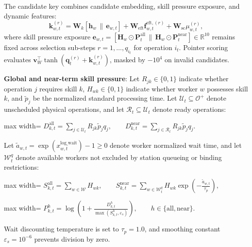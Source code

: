 \documentclass[journal,10pt]{IEEEtran}
\begin{document}
The candidate key combines candidate embedding, skill pressure exposure, and dynamic features:
\begin{equation}
\mathbf k_{w,t}^{(r)}=\mathbf W_k[\mathbf h_w\,\|\,\mathbf e_{w,t}]+\mathbf W_{\mathrm{eft}}\mathbf f_{w,t}^{\mathrm{eft},(r)}+\mathbf W_{\mathrm{sc}}\mu_{w,t}^{(r)},
\end{equation}
where skill pressure exposure $\mathbf e_{w,t} = [\mathbf H_w \odot \mathbf P_t^{\mathrm{all}} \,\|\, \mathbf H_w \odot \mathbf P_t^{\mathrm{near}}] \in \mathbb R^{10}$ remains fixed across selection sub-steps $r=1,\dots,q_{i_t}$ for operation $i_t$. Pointer scoring evaluates $\mathbf v_W^{\top}\tanh(\mathbf q_t^{(r)}+\mathbf k_{w,t}^{(r)})$, masked by $-10^4$ on invalid candidates.

\textbf{Global and near-term skill pressure}:
Let $R_{jk}\in\{0,1\}$ indicate whether operation $j$ requires skill $k$, $H_{wk}\in\{0,1\}$ indicate whether worker $w$ possesses skill $k$, and $\widetilde p_j$ be the normalized standard processing time. Let $\mathcal U_t\subseteq\mathcal O^+$ denote unscheduled physical operations, and let $\mathcal R_t\subseteq\mathcal U_t$ denote ready operations:
\begin{center}
\begin{adjustbox}{max width=\columnwidth}
$\displaystyle
D_{k,t}^{\mathrm{all}} = \sum_{j\in\mathcal U_t} R_{jk}\widetilde p_j q_j, \qquad D_{k,t}^{\mathrm{near}} = \sum_{j\in\mathcal R_t} R_{jk}\widetilde p_j q_j.
$
\end{adjustbox}
\end{center}
Let $\widetilde a_{w,t} = \exp(x_{w,t}^{\mathrm{log\_wait}}) - 1 \ge 0$ denote worker normalized wait time, and let $\mathcal W_t^q$ denote available workers not excluded by station queueing or binding restrictions:
\begin{center}
\begin{adjustbox}{max width=\columnwidth}
$\displaystyle
S_{k,t}^{\mathrm{all}} = \sum_{w\in\mathcal W} H_{wk}, \qquad S_{k,t}^{\mathrm{near}} = \sum_{w\in\mathcal W_t^q} H_{wk}\exp\!\left(-\frac{\widetilde a_{w,t}}{\tau_p}\right),
$
\end{adjustbox}
\end{center}
\begin{center}
\begin{adjustbox}{max width=\columnwidth}
$\displaystyle
P_{k,t}^h = \log\!\left(1 + \frac{D_{k,t}^h}{\max(S_{k,t}^h, \varepsilon_s)}\right), \qquad h\in\{\mathrm{all},\mathrm{near}\}.
$
\end{adjustbox}
\end{center}
Wait discounting temperature is set to $\tau_p=1.0$, and smoothing constant $\varepsilon_s=10^{-6}$ prevents division by zero.
\end{document}
